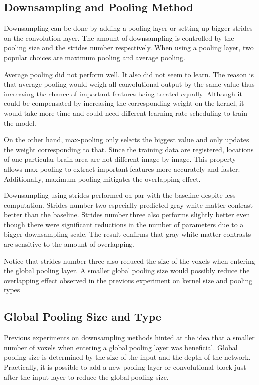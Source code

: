 \documentclass{article}
\begin{document}
    \subsection*{Downsampling and Pooling Method}
    Downsampling can be done by adding a pooling layer or setting up bigger strides on the convolution layer. 
    The amount of downsampling is controlled by the pooling size and the strides number respectively. 
    When using a pooling layer, two popular choices are maximum pooling and average pooling.  

    Average pooling did not perform well. 
    It also did not seem to learn. 
    The reason is that average pooling would weigh all convolutional output by the same value thus increasing the chance of important features being treated equally. 
    Although it could be compensated by increasing the corresponding weight on the kernel, it would take more time and could need different learning rate scheduling to train the model.

    On the other hand, max-pooling only selects the biggest value and only updates the weight corresponding to that. 
    Since the training data are registered, locations of one particular brain area are not different image by image. 
    This property allows max pooling to extract important features more accurately and faster. 
    Additionally, maximum pooling mitigates the overlapping effect.

    Downsampling using strides performed on par with the baseline despite less computation. 
    Strides number two especially predicted gray-white matter contrast better than the baseline. 
    Strides number three also performs slightly better even though there were significant reductions in the number of parameters due to a bigger downsampling scale. 
    The result confirms that gray-white matter contrasts are sensitive to the amount of overlapping.

    Notice that strides number three also reduced the size of the voxels when entering the global pooling layer. 
    A smaller global pooling size would possibly reduce the overlapping effect observed in the previous experiment on kernel size and pooling types

    \subsection*{Global Pooling Size and Type}
    Previous experiments on downsampling methods hinted at the idea that a smaller number of voxels when entering a global pooling layer was beneficial. 
    Global pooling size is determined by the size of the input and the depth of the network. 
    Practically, it is possible to add a new pooling layer or convolutional block just after the input layer to reduce the global pooling size. 
\end{document}

